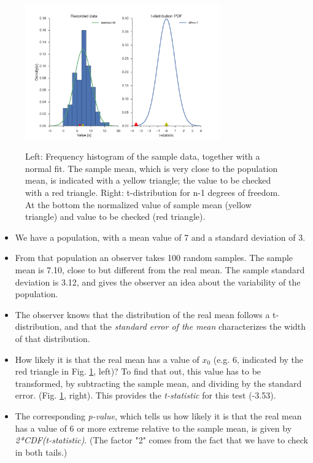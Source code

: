 \begin{figure}[h]
  \centering
  \includegraphics[width=0.75\textwidth]{../Images/ttestExplained.png}\\
  \caption{Left: Frequency histogram of the sample data, together with a normal fit. The sample mean, which is very close to the population mean, is indicated with a yellow triangle; the value to be checked with a red triangle. Right: t-distribution for n-1 degrees of freedom. At the bottom the normalized value of sample mean (yellow triangle) and value to be checked (red triangle).}\label{fig:ttestExplained}
\end{figure}

\begin{itemize}
  \item We have a population, with a mean value of 7 and a standard deviation of 3.
  \item From that population an observer takes 100 random samples. The sample mean is 7.10, close to but different from the real mean. The sample standard deviation is 3.12, and gives the observer an idea about the variability of the population.
  \item The observer knows that the distribution of the real mean follows a t-distribution, and that the \emph{standard error of the mean} characterizes the width of that distribution.
  \item How likely it is that the real mean has a value of $x_0$ (e.g. 6, indicated by the red triangle in Fig. \ref{fig:ttestExplained}, left)? To find that out, this value has to be transformed, by subtracting the sample mean, and dividing by the standard error. (Fig. \ref{fig:ttestExplained}, right). This provides the \emph{t-statistic} for this test (-3.53).
  \item The corresponding \emph{p-value}, which tells us how likely it is that the real mean has a value of 6 or more extreme relative to the sample mean, is given by \emph{2*CDF(t-statistic)}. (The factor "2" comes from the fact that we have to check in both tails.)
\end{itemize}

